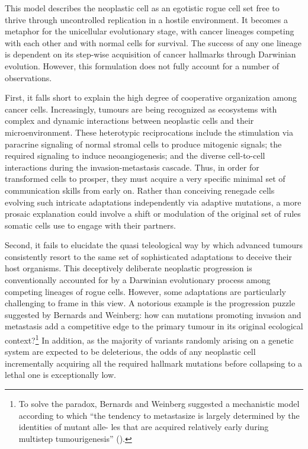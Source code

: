 This model describes the neoplastic cell as an egotistic rogue cell set free to
thrive through uncontrolled replication in a hostile environment.  It becomes a
metaphor for the unicellular evolutionary stage, with cancer lineages competing
with each other and with normal cells for survival.\cite{merlo_cancer_2006} The
success of any one lineage is dependent on its \mbox{step-wise} acquisition of
cancer hallmarks through Darwinian evolution.  However, this formulation does
not fully account for a number of observations.\cite{davies_cancer_2011}

First, it falls short to explain the high degree of cooperative organization
among cancer cells.  Increasingly, tumours are being recognized as ecosystems
with complex and dynamic interactions between neoplastic cells and their
microenvironment.\cite{polyak_co-evolution_2009} These heterotypic
reciprocations include the stimulation via paracrine signaling of normal stromal
cells to produce mitogenic signals; the required signaling to induce
neoangiogenesis; and the diverse cell-to-cell interactions during the
invasion-metastasis cascade.\cite{axelrod_evolution_2006} Thus, in order for
transformed cells to prosper, they must acquire a very specific minimal set of
communication skills from early on.  Rather than conceiving renegade cells
evolving such intricate adaptations independently via adaptive mutations, a more
prosaic explanation could involve a shift or modulation of the original set of
rules somatic cells use to engage with their partners.

Second, it fails to elucidate the quasi teleological way by which advanced
tumours consistently resort to the same set of sophisticated adaptations to
deceive their host organisms.\cite{hanahan_hallmarks_2011}
This deceptively deliberate neoplastic progression is conventionally accounted
for by a Darwinian evolutionary process among competing lineages of rogue
cells.\cite{merlo_cancer_2006} However, some adaptations are particularly
challenging to frame in this view.  A notorious example is the progression
puzzle suggested by Bernards and Weinberg: how can mutations promoting invasion
and metastasis add a competitive edge to the primary tumour in its original
ecological context?\footnote{To solve the paradox, Bernards and Weinberg
  suggested a mechanistic model according to which ``the tendency to metastasize
  is largely determined by the identities of mutant alle- les that are acquired
  relatively early during multistep tumourigenesis''
  (\citealp{bernards_progression_2002}).}  In addition, as the majority of
variants randomly arising on a genetic system are expected to be deleterious,
the odds of any neoplastic cell incrementally acquiring all the required
hallmark mutations before collapsing to a lethal one is exceptionally low.

